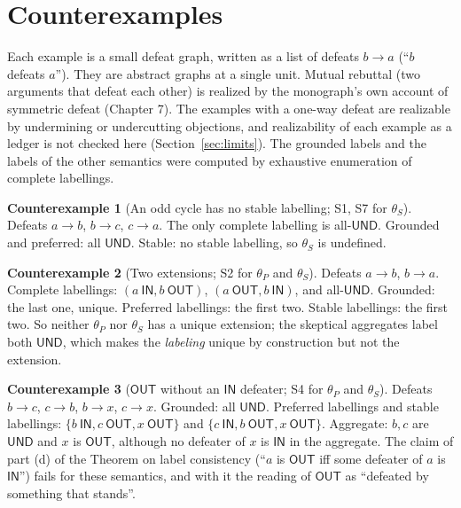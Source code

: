 \documentclass[11pt]{article}
\theoremstyle{plain}
\theoremstyle{definition}
\newtheorem{counterexample}{Counterexample}
\theoremstyle{remark}
\newcommand{\IN}{\textsf{IN}}
\newcommand{\OUT}{\textsf{OUT}}
\newcommand{\UND}{\textsf{UND}}
\begin{document}
\section{Counterexamples}\label{sec:cex}

Each example is a small defeat graph, written as a list of defeats $b\to a$ (``$b$ defeats $a$''). They are abstract graphs at a single unit. Mutual rebuttal (two arguments that defeat each other) is realized by the monograph's own account of symmetric defeat (Chapter 7). The examples with a one-way defeat are realizable by undermining or undercutting objections, and realizability of each example as a ledger is not checked here (Section~\ref{sec:limits}). The grounded labels and the labels of the other semantics were computed by exhaustive enumeration of complete labellings.

\begin{counterexample}[An odd cycle has no stable labelling; S1, S7 for $\theta_S$]\label{cex:odd}
Defeats $a\to b$, $b\to c$, $c\to a$. The only complete labelling is all-$\UND$. Grounded and preferred: all $\UND$. Stable: no stable labelling, so $\theta_S$ is undefined.
\end{counterexample}

\begin{counterexample}[Two extensions; S2 for $\theta_P$ and $\theta_S$]\label{cex:two}
Defeats $a\to b$, $b\to a$. Complete labellings: $(a\ \IN, b\ \OUT)$, $(a\ \OUT, b\ \IN)$, and all-$\UND$. Grounded: the last one, unique. Preferred labellings: the first two. Stable labellings: the first two. So neither $\theta_P$ nor $\theta_S$ has a unique extension; the skeptical aggregates label both $\UND$, which makes the \emph{labeling} unique by construction but not the extension.
\end{counterexample}

\begin{counterexample}[$\OUT$ without an $\IN$ defeater; S4 for $\theta_P$ and $\theta_S$]\label{cex:outsupport}
Defeats $b\to c$, $c\to b$, $b\to x$, $c\to x$. Grounded: all $\UND$. Preferred labellings and stable labellings: $\{b\ \IN,c\ \OUT,x\ \OUT\}$ and $\{c\ \IN,b\ \OUT,x\ \OUT\}$. Aggregate: $b,c$ are $\UND$ and $x$ is $\OUT$, although no defeater of $x$ is $\IN$ in the aggregate. The claim of part (d) of the Theorem on label consistency (``$a$ is $\OUT$ iff some defeater of $a$ is $\IN$'') fails for these semantics, and with it the reading of $\OUT$ as ``defeated by something that stands''.
\end{counterexample}
\end{document}
